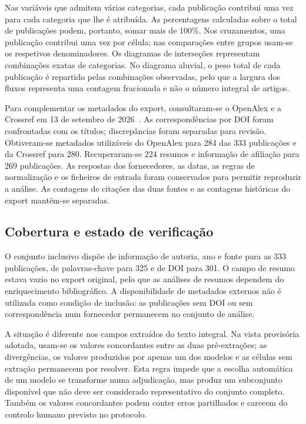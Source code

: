 Nas variáveis que admitem várias categorias, cada publicação contribui
uma vez para cada categoria que lhe é atribuída. As percentagens
calculadas sobre o total de publicações podem, portanto, somar mais
de 100\%. Nos cruzamentos, uma publicação contribui uma vez por célula;
nas comparações entre grupos usam-se os respetivos denominadores.
Os diagramas de interseções representam combinações exatas de categorias.
No diagrama aluvial, o peso total de cada publicação é repartido pelas
combinações observadas, pelo que a largura dos fluxos representa uma
contagem fracionada e não o número integral de artigos.

Para complementar os metadados do export, consultaram-se o OpenAlex
e a Crossref em 13 de setembro de 2026~\cite{Priem2022OpenAlex,Crossref2026API}.
As correspondências por DOI foram confrontadas com os títulos;
discrepâncias foram separadas para revisão. Obtiveram-se metadados
utilizáveis do OpenAlex para 284 das 333 publicações e da Crossref
para 280. Recuperaram-se 224 resumos e informação de afiliação para
269 publicações. As respostas dos fornecedores, as datas, as regras
de normalização e os ficheiros de entrada foram conservados para
permitir reproduzir a análise. As contagens de citações das duas
fontes e as contagens históricas do export mantêm-se separadas.

\subsection{Cobertura e estado de verificação}

O conjunto inclusivo dispõe de informação de autoria, ano e fonte
para as 333 publicações, de palavras-chave para 325 e de DOI para 301.
O campo de resumo estava vazio no export original, pelo que as
análises de resumos dependem do enriquecimento bibliográfico.
A disponibilidade de metadados externos não é utilizada como condição
de inclusão: as publicações sem DOI ou sem correspondência num
fornecedor permanecem no conjunto de análise.

A situação é diferente nos campos extraídos do texto integral.
Na vista provisória adotada, usam-se os valores concordantes entre
as duas pré-extrações; as divergências, os valores produzidos por
apenas um dos modelos e as células sem extração permanecem por
resolver. Esta regra impede que a escolha automática de um modelo
se transforme numa adjudicação, mas produz um subconjunto disponível
que não deve ser considerado representativo do conjunto completo.
Também os valores concordantes podem conter erros partilhados e
carecem do controlo humano previsto no protocolo.

